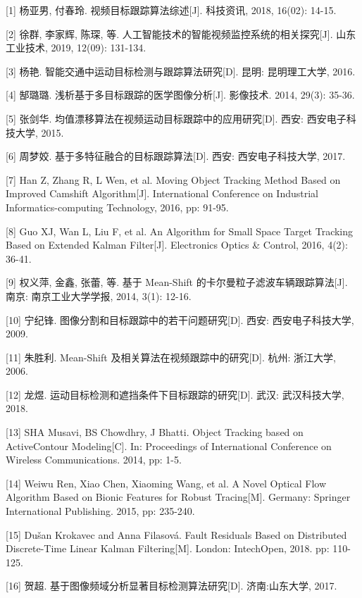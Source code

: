 \documentclass[
]{article}
\begin{document}
{[}1{]} 杨亚男, 付春玲. 视频目标跟踪算法综述{[}J{]}. 科技资讯, 2018,
16(02): 14-15.

{[}2{]} 徐群, 李家辉, 陈琛, 等.
人工智能技术的智能视频监控系统的相关探究{[}J{]}. 山东工业技术, 2019,
12(09): 131-134.

{[}3{]} 杨艳. 智能交通中运动目标检测与跟踪算法研究{[}D{]}. 昆明:
昆明理工大学, 2016.

{[}4{]} 郜璐璐. 浅析基于多目标跟踪的医学图像分析{[}J{]}. 影像技术. 2014,
29(3): 35-36.

{[}5{]} 张剑华. 均值漂移算法在视频运动目标跟踪中的应用研究{[}D{]}. 西安:
西安电子科技大学, 2015.

{[}6{]} 周梦姣. 基于多特征融合的目标跟踪算法{[}D{]}. 西安:
西安电子科技大学, 2017.

{[}7{]} Han Z, Zhang R, L Wen, et al. Moving Object Tracking Method
Based on Improved Camshift Algorithm{[}J{]}. International Conference on
Industrial Informatics-computing Technology, 2016, pp: 91-95.

{[}8{]} Guo XJ, Wan L, Liu F, et al. An Algorithm for Small Space Target
Tracking Based on Extended Kalman Filter{[}J{]}. Electronics Optics \&
Control, 2016, 4(2): 36-41.

{[}9{]} 权义萍, 金鑫, 张蕾, 等. 基于 Mean-Shift
的卡尔曼粒子滤波车辆跟踪算法{[}J{]}. 南京: 南京工业大学学报, 2014, 3(1):
12-16.

{[}10{]} 宁纪锋. 图像分割和目标跟踪中的若干问题研究{[}D{]}. 西安:
西安电子科技大学, 2009.

{[}11{]} 朱胜利. Mean-Shift 及相关算法在视频跟踪中的研究{[}D{]}. 杭州:
浙江大学, 2006.

{[}12{]} 龙煜. 运动目标检测和遮挡条件下目标跟踪的研究{[}D{]}. 武汉:
武汉科技大学, 2018.

{[}13{]} SHA Musavi, BS Chowdhry, J Bhatti. Object Tracking based on
ActiveContour Modeling{[}C{]}. In: Proceedings of International
Conference on Wireless Communications. 2014, pp: 1-5.

{[}14{]} Weiwu Ren, Xiao Chen, Xiaoming Wang, et al. A Novel Optical
Flow Algorithm Based on Bionic Features for Robust Tracing{[}M{]}.
Germany: Springer International Publishing. 2015, pp: 235-240.

{[}15{]} Dušan Krokavec and Anna Filasová. Fault Residuals Based on
Distributed Discrete-Time Linear Kalman Filtering{[}M{]}. London:
IntechOpen, 2018. pp: 110-125.

{[}16{]} 贺超. 基于图像频域分析显著目标检测算法研究{[}D{]}.
济南:山东大学, 2017.
\end{document}
